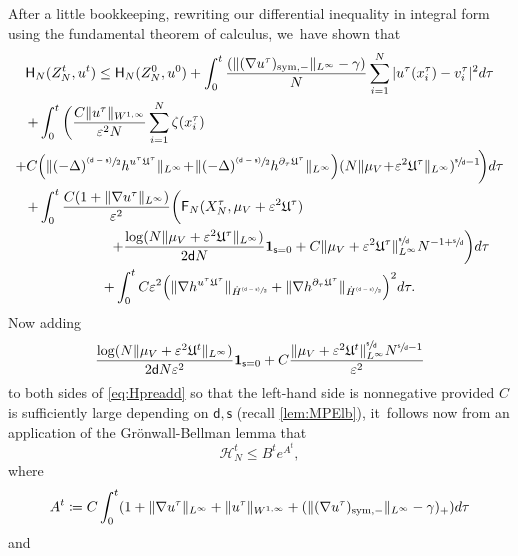 \documentclass[JEP,XML,SOM,Unicode,published]{cedram}
\newcommand{\psfrac}[2]{\sfrac{(#1)}{#2}}
\newcommand{\sym}{\textup{sym}}
\theoremstyle{plain}
\theoremstyle{definition}
\DeclarePairedDelimiter{\pa}{\lparen}{\rparen}
\newcommand{\Bpa}[1]{\Bigl(#1\Bigr)}
\let\div\relax
\DeclareMathOperator{\div}{\mathrm{div}}
\let\ga\gamma
\let\vep\varepsilon
\let\p\partial
\let\ux X
\let\uz Z
\newcommand{\indic}{\mathbf{1}}
\newcommand{\Uu}{\mathfrak{U}}
\newcommand{\Fr}{\mathsf{F}}
\newcommand{\Hr}{\mathsf{H}}
\renewcommand{\d}{\mathsf{d}}
\newcommand{\s}{\mathsf{s}}
\begin{document}
After a little bookkeeping, rewriting our differential inequality in integral form using the fundamental theorem of calculus, we~have shown that
\begin{multline}\label{eq:Hpreadd}
\Hr_{N}(\uz_N^t,u^t) \leq \Hr_{N}(\uz_N^0,u^0) + \int_0^t\frac{(\|(\nabla u^\tau)_{\sym,-}\|_{L^\infty}-\ga)}{N}\sum_{i=1}^N |u^\tau(x_i^\tau)-v_i^\tau|^2 d\tau \\
\shoveleft{+ \int_0^t\bigg(\frac{C\|u^\tau\|_{W^{1,\infty}}}{\vep^2N}\sum_{i=1}^N \zeta(x_i^\tau)}\\
+ C\Bpa{\|(-\Delta)^{\psfrac{\d-\s}{2}}\div h^{u^\tau\Uu^\tau}\|_{L^\infty}\!+\!\|(-\Delta)^{\psfrac{\d-\s}{2}}h^{\p_\tau\Uu^\tau}\|_{L^\infty}}(N\|{\mu_V\!+\!\vep^2\Uu^\tau}\|_{L^\infty})^{\sfrac{\s}{\d}-1}\!\bigg) d\tau\\
\shoveleft{+\int_0^t\frac{C(1+\|\nabla u^\tau\|_{L^\infty})}{\vep^2}\bigg(\Fr_N (\ux_N^\tau,\mu_V+\vep^2\Uu^\tau)} \\
\shoveright{+ \frac{\log(N\|\mu_V+\vep^2\Uu^\tau\|_{L^\infty})}{2\d N}\indic_{\s=0} + C \|\mu_V+\vep^2\Uu^\tau\|_{L^\infty}^{\sfrac{\s}{\d}} N^{-1+\sfrac{\s}{\d}}\bigg)d\tau}\\
+\int_0^t C\vep^2\pa*{\|\nabla\div h^{u^\tau\Uu^\tau}\|_{\dot{H}^{\psfrac{\d-\s}{2}}} + \|\nabla h^{\p_\tau\Uu^\tau}\|_{\dot{H}^{\psfrac{\d-\s}{2}}}}^2d\tau.
\end{multline}
Now adding
\begin{equation*}
\frac{\log(N\|\mu_V+\vep^2\Uu^t\|_{L^\infty})}{2\d N\vep^2}\indic_{\s=0} + C\frac{\|\mu_V+\vep^2\Uu^t\|_{L^\infty}^{\sfrac{\s}{\d}}N^{\sfrac{\s}{\d}-1}}{\vep^2}
\end{equation*}
to both sides of \eqref{eq:Hpreadd} so that the left-hand side is nonnegative provided $C$ is sufficiently large depending on $\d,\s$ (recall \cref{lem:MPElb}), it~follows now from an application of the Grönwall-Bellman lemma that
\begin{equation*}
\mathscr{H}_{N}^t \leq B^t e^{A^t},
\end{equation*}
where
\begin{equation*}
A^t\coloneqq C\int_0^t \pa*{1+\|\nabla u^\tau\|_{L^\infty} + \|u^\tau\|_{W^{1,\infty}} + (\|(\nabla u^\tau)_{\sym,-}\|_{L^\infty}-\ga)_+}d\tau
\end{equation*}
and
\end{document}
